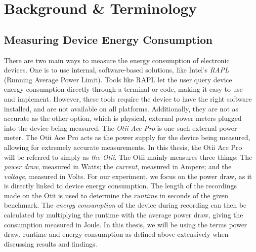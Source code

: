 \section{Background \& Terminology}
\label{sec:background}

\subsection*{Measuring Device Energy Consumption}
There are two main ways to measure the energy consumption of electronic devices. One is to use internal, software-based solutions, like Intel's \textit{RAPL} (Running Average Power Limit)\cite{khan2018rapl}. Tools like RAPL let the user query device energy consumption directly through a terminal or code, making it easy to use and implement. However, these tools require the device to have the right software installed, and are not available on all platforms. Additionally, they are not as accurate as the other option, which is physical, external power meters plugged into the device being measured\cite{kavanagh2019rapid}. The \textit{Otii Ace Pro} is one such external power meter\cite{otii_website}. The Otii Ace Pro acts as the power supply for the device being measured, allowing for extremely accurate measurements. In this thesis, the Otii Ace Pro will be referred to simply as \textit{the Otii}. The Otii mainly measures three things: The \textit{power draw}, measured in Watts; the \textit{current}, measured in Ampere; and the \textit{voltage}, measured in Volts. For our experiment, we focus on the power draw, as it is directly linked to device energy consumption. The length of the recordings made on the Otii is used to determine the \textit{runtime} in seconds of the given benchmark. The \textit{energy consumption} of the device during recording can then be calculated by multiplying the runtime with the average power draw, giving the consumption measured in Joule. In this thesis, we will be using the terms power draw, runtime and energy consumption as defined above extensively when discussing results and findings.

